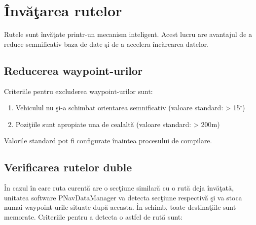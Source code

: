 \label{cap5}


\label{Chapter5} %

\thispagestyle{fancy}


\section{Învăţarea rutelor} 
Rutele sunt învăţate printr-un mecanism inteligent. Acest lucru are avantajul de a reduce semnificativ baza de date şi de a accelera încărcarea datelor.

	\subsection{Reducerea waypoint-urilor} 
	Criteriile pentru excluderea waypoint-urilor sunt:
	\begin{enumerate}
	 \setlength\itemsep{0em}
		\item Vehiculul nu şi-a schimbat orientarea semnificativ (valoare standard: > 15$^{\circ}$)
		\item Poziţiile sunt apropiate una de cealaltă (valoare standard: > 200m)
	\end{enumerate}
	
	Valorile standard pot fi configurate  înaintea procesului de compilare.
	
	
	\subsection{Verificarea rutelor duble} 
	În cazul în care ruta curentă are o secţiune similară cu o rută deja învăţată, unitatea software PNavDataManager va detecta secţiune respectivă şi va stoca numai waypoint-urile situate după aceasta. În schimb, toate destinaţiile sunt memorate. Criteriile pentru a detecta o astfel de rută sunt:
	

